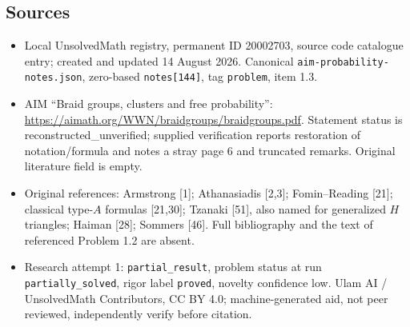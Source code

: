 \documentclass[11pt]{article}
\begin{document}
\subsection{Sources}
\begin{itemize}
\item Local UnsolvedMath registry, permanent ID 20002703, source code catalogue entry; created and updated 14 August 2026. Canonical \texttt{aim-probability-notes.json}, zero-based \texttt{notes[144]}, tag \texttt{problem}, item 1.3.
\item AIM ``Braid groups, clusters and free probability'': \url{https://aimath.org/WWN/braidgroups/braidgroups.pdf}. Statement status is reconstructed\_unverified; supplied verification reports restoration of notation/formula and notes a stray page 6 and truncated remarks. Original literature field is empty.
\item Original references: Armstrong [1]; Athanasiadis [2,3]; Fomin--Reading [21]; classical type-$A$ formulas [21,30]; Tzanaki [51], also named for generalized $H$ triangles; Haiman [28]; Sommers [46]. Full bibliography and the text of referenced Problem 1.2 are absent.
\item Research attempt 1: \texttt{partial\_result}, problem status at run \texttt{partially\_solved}, rigor label \texttt{proved}, novelty confidence low. Ulam AI / UnsolvedMath Contributors, CC BY 4.0; machine-generated aid, not peer reviewed, independently verify before citation.
\end{itemize}
\end{document}
